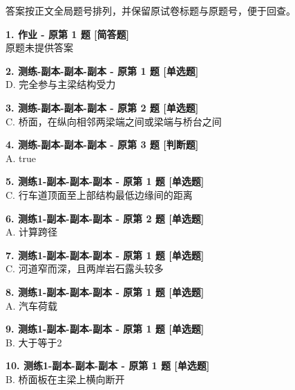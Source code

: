 \documentclass[UTF8,zihao=-4,openany]{ctexbook}
\begin{document}
\textcolor{muted}{\small 答案按正文全局题号排列，并保留原试卷标题与原题号，便于回查。}

\begin{answerline}
\textbf{1. 作业 - 原第 1 题 [简答题]}\\
原题未提供答案
\end{answerline}

\begin{answerline}
\textbf{2. 测练-副本-副本-副本 - 原第 1 题 [单选题]}\\
D. 完全参与主梁结构受力
\end{answerline}

\begin{answerline}
\textbf{3. 测练-副本-副本-副本 - 原第 2 题 [单选题]}\\
C. 桥面，在纵向相邻两梁端之间或梁端与桥台之间
\end{answerline}

\begin{answerline}
\textbf{4. 测练-副本-副本-副本 - 原第 3 题 [判断题]}\\
A. true
\end{answerline}

\begin{answerline}
\textbf{5. 测练1-副本-副本-副本 - 原第 1 题 [单选题]}\\
C. 行车道顶面至上部结构最低边缘间的距离
\end{answerline}

\begin{answerline}
\textbf{6. 测练1-副本-副本-副本 - 原第 2 题 [单选题]}\\
A. 计算跨径
\end{answerline}

\begin{answerline}
\textbf{7. 测练1-副本-副本-副本 - 原第 1 题 [单选题]}\\
C. 河道窄而深，且两岸岩石露头较多
\end{answerline}

\begin{answerline}
\textbf{8. 测练1-副本-副本-副本 - 原第 1 题 [单选题]}\\
A. 汽车荷载
\end{answerline}

\begin{answerline}
\textbf{9. 测练1-副本-副本-副本 - 原第 1 题 [单选题]}\\
B. 大于等于2
\end{answerline}

\begin{answerline}
\textbf{10. 测练1-副本-副本-副本 - 原第 1 题 [单选题]}\\
B. 桥面板在主梁上横向断开
\end{answerline}
\end{document}
